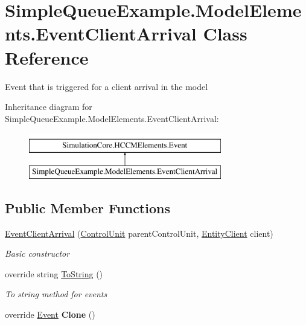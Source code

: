 \hypertarget{class_simple_queue_example_1_1_model_elements_1_1_event_client_arrival}{}\section{Simple\+Queue\+Example.\+Model\+Elements.\+Event\+Client\+Arrival Class Reference}
\label{class_simple_queue_example_1_1_model_elements_1_1_event_client_arrival}


Event that is triggered for a client arrival in the model  


Inheritance diagram for Simple\+Queue\+Example.\+Model\+Elements.\+Event\+Client\+Arrival\+:\begin{figure}[H]
\begin{center}
\leavevmode
\includegraphics[height=2.000000cm]{class_simple_queue_example_1_1_model_elements_1_1_event_client_arrival}
\end{center}
\end{figure}
\subsection*{Public Member Functions}
\begin{DoxyCompactItemize}
\item 
\hyperlink{class_simple_queue_example_1_1_model_elements_1_1_event_client_arrival_af8bf449b657c466c330b13857fcbfa26}{Event\+Client\+Arrival} (\hyperlink{class_simulation_core_1_1_h_c_c_m_elements_1_1_control_unit}{Control\+Unit} parent\+Control\+Unit, \hyperlink{class_simple_queue_example_1_1_model_elements_1_1_entity_client}{Entity\+Client} client)
\begin{DoxyCompactList}\small\item\em Basic constructor \end{DoxyCompactList}\item 
override string \hyperlink{class_simple_queue_example_1_1_model_elements_1_1_event_client_arrival_a4e065624f704a12288a0cae66c166a0a}{To\+String} ()
\begin{DoxyCompactList}\small\item\em To string method for events \end{DoxyCompactList}\item 
override \hyperlink{class_simulation_core_1_1_h_c_c_m_elements_1_1_event}{Event} {\bfseries Clone} ()\hypertarget{class_simple_queue_example_1_1_model_elements_1_1_event_client_arrival_a505a1fb00c7b2047ecd023eb3a5c1ec3}{}\label{class_simple_queue_example_1_1_model_elements_1_1_event_client_arrival_a505a1fb00c7b2047ecd023eb3a5c1ec3}

\end{DoxyCompactItemize}

